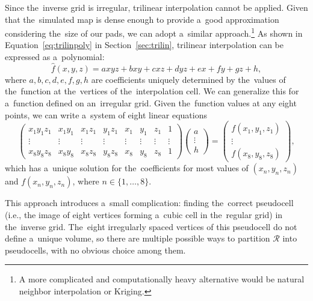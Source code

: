 			Since the~inverse grid is irregular, trilinear interpolation cannot be applied. Given that the~simulated map is dense enough to provide a~good approximation considering the~size of our pads, we can adopt a~similar approach.\footnote{A more complicated and computationally heavy alternative would be natural neighbor interpolation or Kriging.} As shown in Equation~\ref{eq:trilinpoly} in Section~\ref{sec:trilin}, trilinear interpolation can be expressed as a~polynomial:
				\begin{equation}
					\widehat{f}(x,y,z) = axyz + bxy + cxz + dyz + ex + fy + gz + h,
				\end{equation}
			where $a,b,c,d,e,f,g,h$ are coefficients uniquely determined by the~values of the~function at the~vertices of the~interpolation cell. We can generalize this for a~function defined on an~irregular grid. Given the~function values at any eight points, we can write a~system of eight linear equations
				\begin{equation}
					\begin{pmatrix}
						x_1 y_1 z_1 & x_1 y_1 & x_1 z_1 & y_1 z_1 & x_1 & y_1 & z_1 & 1\\
						\vdots & \vdots & \vdots & \vdots & \vdots & \vdots & \vdots & \vdots\\
						x_8 y_8 z_8 & x_8 y_8 & x_8 z_8 & y_8 z_8 & x_8 & y_8 & z_8 & 1
					\end{pmatrix}
					\begin{pmatrix}
						a\\
						\vdots\\
						h
					\end{pmatrix}
					=
					\begin{pmatrix}
						f(x_1,y_1,z_1)\\
						\vdots\\
						f(x_8,y_8,z_8)
					\end{pmatrix},
				\end{equation}
			which has a~unique solution for the~coefficients for most values of $(x_n, y_n, z_n)$ and $f(x_n,y_n,z_n)$, where $n\in\{1,\ldots,8\}$.
			
			This approach introduces a~small complication: finding the~correct pseudocell (i.e., the image of eight vertices forming a~cubic cell in the~regular grid) in the~inverse grid. The~eight irregularly spaced vertices of this pseudocell do not define a~unique volume, so there are multiple possible ways to partition $\mathcal{R}$ into pseudocells, with no obvious choice among them.
			
